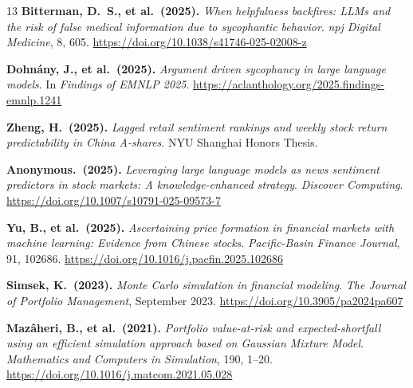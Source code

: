 \documentclass[11pt,a4paper]{article}
\begin{document}
\begin{thebibliography}{13}
\textbf{Bitterman, D.~S., et al.\ (2025).}
\textit{When helpfulness backfires: LLMs and the risk of false medical information due to sycophantic behavior}.
\textit{npj Digital Medicine}, 8, 605. \url{https://doi.org/10.1038/s41746-025-02008-z}

\textbf{Dohn\'{a}ny, J., et al.\ (2025).}
\textit{Argument driven sycophancy in large language models}.
In \textit{Findings of EMNLP 2025}. \url{https://aclanthology.org/2025.findings-emnlp.1241}

\textbf{Zheng, H.\ (2025).}
\textit{Lagged retail sentiment rankings and weekly stock return predictability in China A-shares}.
NYU Shanghai Honors Thesis.

\textbf{Anonymous.\ (2025).}
\textit{Leveraging large language models as news sentiment predictors in stock markets: A knowledge-enhanced strategy}.
\textit{Discover Computing}. \url{https://doi.org/10.1007/s10791-025-09573-7}

\textbf{Yu, B., et al.\ (2025).}
\textit{Ascertaining price formation in financial markets with machine learning: Evidence from Chinese stocks}.
\textit{Pacific-Basin Finance Journal}, 91, 102686.
\url{https://doi.org/10.1016/j.pacfin.2025.102686}

\textbf{Simsek, K.\ (2023).}
\textit{Monte Carlo simulation in financial modeling}.
\textit{The Journal of Portfolio Management}, September 2023.
\url{https://doi.org/10.3905/pa2024pa607}

\textbf{Maz\^{a}heri, B., et al.\ (2021).}
\textit{Portfolio value-at-risk and expected-shortfall using an efficient simulation approach based on Gaussian Mixture Model}.
\textit{Mathematics and Computers in Simulation}, 190, 1--20.
\url{https://doi.org/10.1016/j.matcom.2021.05.028}

\end{thebibliography}
\end{document}
